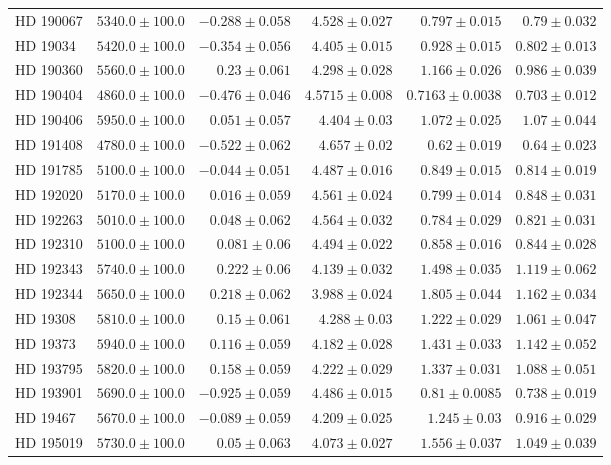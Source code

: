 \begin{longtable*}{lrrrrr}
HD 190067 & $5340.0\pm 100.0$ & $-0.288\pm 0.058$ & $4.528\pm 0.027$ & $0.797\pm 0.015$ & $0.79\pm 0.032$ \\ 
HD 19034 & $5420.0\pm 100.0$ & $-0.354\pm 0.056$ & $4.405\pm 0.015$ & $0.928\pm 0.015$ & $0.802\pm 0.013$ \\ 
HD 190360 & $5560.0\pm 100.0$ & $0.23\pm 0.061$ & $4.298\pm 0.028$ & $1.166\pm 0.026$ & $0.986\pm 0.039$ \\ 
HD 190404 & $4860.0\pm 100.0$ & $-0.476\pm 0.046$ & $4.5715\pm 0.008$ & $0.7163\pm 0.0038$ & $0.703\pm 0.012$ \\ 
HD 190406 & $5950.0\pm 100.0$ & $0.051\pm 0.057$ & $4.404\pm 0.03$ & $1.072\pm 0.025$ & $1.07\pm 0.044$ \\ 
HD 191408 & $4780.0\pm 100.0$ & $-0.522\pm 0.062$ & $4.657\pm 0.02$ & $0.62\pm 0.019$ & $0.64\pm 0.023$ \\ 
HD 191785 & $5100.0\pm 100.0$ & $-0.044\pm 0.051$ & $4.487\pm 0.016$ & $0.849\pm 0.015$ & $0.814\pm 0.019$ \\ 
HD 192020 & $5170.0\pm 100.0$ & $0.016\pm 0.059$ & $4.561\pm 0.024$ & $0.799\pm 0.014$ & $0.848\pm 0.031$ \\ 
HD 192263 & $5010.0\pm 100.0$ & $0.048\pm 0.062$ & $4.564\pm 0.032$ & $0.784\pm 0.029$ & $0.821\pm 0.031$ \\ 
HD 192310 & $5100.0\pm 100.0$ & $0.081\pm 0.06$ & $4.494\pm 0.022$ & $0.858\pm 0.016$ & $0.844\pm 0.028$ \\ 
HD 192343 & $5740.0\pm 100.0$ & $0.222\pm 0.06$ & $4.139\pm 0.032$ & $1.498\pm 0.035$ & $1.119\pm 0.062$ \\ 
HD 192344 & $5650.0\pm 100.0$ & $0.218\pm 0.062$ & $3.988\pm 0.024$ & $1.805\pm 0.044$ & $1.162\pm 0.034$ \\ 
HD 19308 & $5810.0\pm 100.0$ & $0.15\pm 0.061$ & $4.288\pm 0.03$ & $1.222\pm 0.029$ & $1.061\pm 0.047$ \\ 
HD 19373 & $5940.0\pm 100.0$ & $0.116\pm 0.059$ & $4.182\pm 0.028$ & $1.431\pm 0.033$ & $1.142\pm 0.052$ \\ 
HD 193795 & $5820.0\pm 100.0$ & $0.158\pm 0.059$ & $4.222\pm 0.029$ & $1.337\pm 0.031$ & $1.088\pm 0.051$ \\ 
HD 193901 & $5690.0\pm 100.0$ & $-0.925\pm 0.059$ & $4.486\pm 0.015$ & $0.81\pm 0.0085$ & $0.738\pm 0.019$ \\ 
HD 19467 & $5670.0\pm 100.0$ & $-0.089\pm 0.059$ & $4.209\pm 0.025$ & $1.245\pm 0.03$ & $0.916\pm 0.029$ \\ 
HD 195019 & $5730.0\pm 100.0$ & $0.05\pm 0.063$ & $4.073\pm 0.027$ & $1.556\pm 0.037$ & $1.049\pm 0.039$ \\ 

\end{longtable*}
